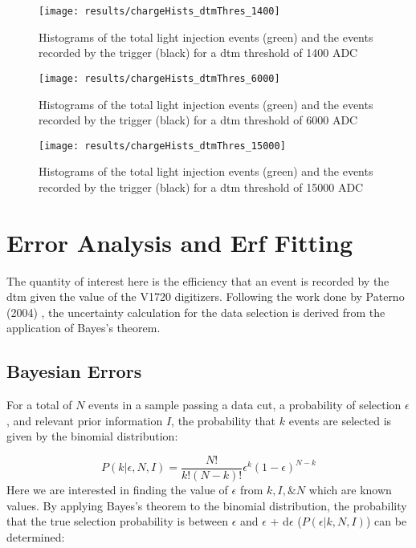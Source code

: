 \begin{figure}
\centering
\texttt{[image: results/chargeHists\_dtmThres\_1400]}
\caption{Histograms of the total light injection events (green) and the events recorded by the trigger (black) for a \gls{dtm} threshold of 1400 ADC}
\label{Fig:effHists1400}
\end{figure}

\begin{figure}
\centering
\texttt{[image: results/chargeHists\_dtmThres\_6000]}
\caption{Histograms of the total light injection events (green) and the events recorded by the trigger (black) for a \gls{dtm} threshold of 6000 ADC}
\label{Fig:effHists6000}
\end{figure}

\begin{figure}
\centering
\texttt{[image: results/chargeHists\_dtmThres\_15000]}
\caption{Histograms of the total light injection events (green) and the events recorded by the trigger (black) for a \gls{dtm} threshold of 15000 ADC}
\label{Fig:effHists15000}
\end{figure}


\clearpage
\section{Error Analysis and Erf Fitting}
The quantity of interest here is the efficiency that an event is recorded by the \gls{dtm} given the value of the V1720 digitizers. Following the work done by Paterno (2004) \cite{paterno2004calculatingErrors}, the uncertainty calculation for the data selection is derived from the application of Bayes's theorem.

\subsection{Bayesian Errors}
For a total of $N$ events in a sample passing a data cut, a probability of selection $\epsilon$, and relevant prior information $I$, the probability that $k$ events are selected is given by the binomial distribution:

\begin{equation}
P(k|\epsilon,N,I) = \frac{N!}{k!(N-k)!} \epsilon^k (1-\epsilon)^{N-k}
\label{Eq:binomial}
\end{equation}
Here we are interested in finding the value of $\epsilon$ from $k,I, \&N$ which are known values. By applying Bayes's theorem to the binomial distribution, the probability that the true selection probability is between $\epsilon$ and $\epsilon$ + d$\epsilon$ ($P(\epsilon|k,N,I)$) can be determined:

